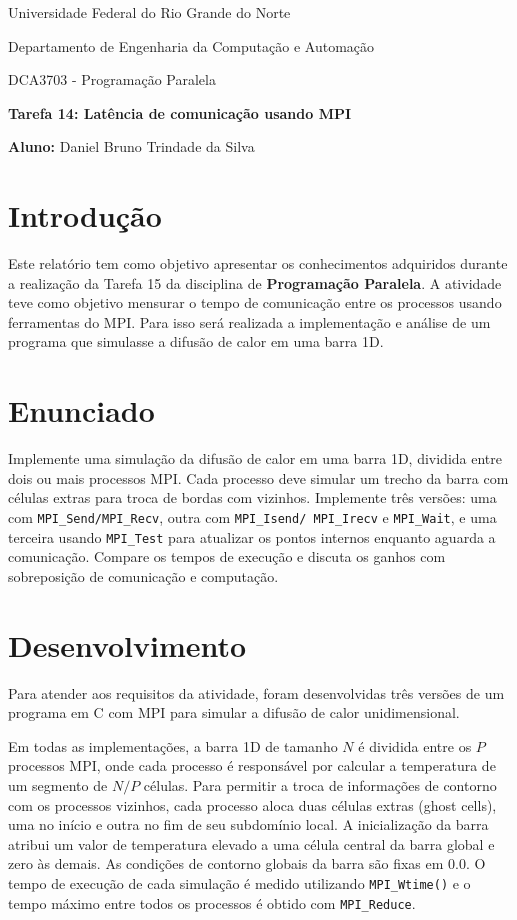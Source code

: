 \documentclass[a4paper, 12pt]{article}
\begin{document}
	
	\begin{center}
		Universidade Federal do Rio Grande do Norte
		
		Departamento de Engenharia da Computação e Automação  
		
		DCA3703 - Programação Paralela  
		
		\textbf{Tarefa 14: Latência de comunicação usando MPI}  
		
		\textbf{Aluno:} Daniel Bruno Trindade da Silva  
	\end{center}  
	
	\section{Introdução}
	
	\hspace{0.62cm}Este relatório tem como objetivo apresentar os conhecimentos adquiridos durante a realização da Tarefa 15 da disciplina de \textbf{Programação Paralela}. A atividade teve como objetivo mensurar o tempo de comunicação entre os processos usando ferramentas do MPI. Para isso será realizada a implementação e análise de um programa que simulasse a difusão de calor em uma barra 1D. 
	
	\section{Enunciado}
	
	\hspace{0.62cm}Implemente uma simulação da difusão de calor em uma barra 1D, dividida entre dois ou mais processos MPI. Cada processo deve simular um trecho da barra com células extras para troca de bordas com vizinhos. Implemente três versões: uma com \texttt{MPI\_Send/MPI\_Recv}, outra com \texttt{MPI\_Isend/ MPI\_Irecv} e \texttt{MPI\_Wait}, e uma terceira usando \texttt{MPI\_Test} para atualizar os pontos internos enquanto aguarda a comunicação. Compare os tempos de execução e discuta os ganhos com sobreposição de comunicação e computação.
	
	\section{Desenvolvimento}
	\hspace{0.62cm}Para atender aos requisitos da atividade, foram desenvolvidas três versões de um programa em C com MPI para simular a difusão de calor unidimensional. 
	
	Em todas as implementações, a barra 1D de tamanho $N$ é dividida entre os $P$ processos MPI, onde cada processo é responsável por calcular a temperatura de um segmento de $N/P$ células. Para permitir a troca de informações de contorno com os processos vizinhos, cada processo aloca duas células extras (ghost cells), uma no início e outra no fim de seu subdomínio local. A inicialização da barra atribui um valor de temperatura elevado a uma célula central da barra global e zero às demais. As condições de contorno globais da barra são fixas em 0.0. O tempo de execução de cada simulação é medido utilizando \texttt{MPI\_Wtime()} e o tempo máximo entre todos os processos é obtido com \texttt{MPI\_Reduce}.
	
\end{document}
